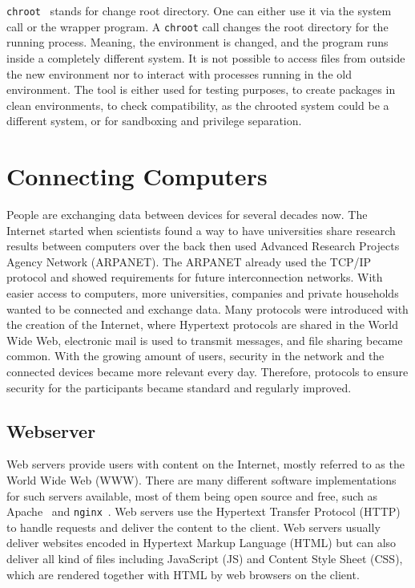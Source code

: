 \texttt{chroot}~\cite{ogroupchroot} stands for \textquotedbl change root
directory\textquotedbl. One can either use it via the system call or the
wrapper program. A \texttt{chroot} call changes the root directory for the
running process. Meaning, the environment is changed, and the program runs
inside a completely different system. It is not possible to access files from
outside the new environment nor to interact with processes running in the old
environment. The tool is either used for testing purposes, to create packages
in clean environments, to check compatibility, as the chrooted system could be
a different system, or for sandboxing and privilege separation.

\section{Connecting Computers}

People are exchanging data between devices for several decades now. The Internet
started when scientists found a way to have universities share research results
between computers over the back then used Advanced Research Projects Agency
Network (ARPANET).  The ARPANET already used the TCP/IP protocol and showed
requirements for future interconnection networks. With easier access to
computers, more universities, companies and private households wanted to be
connected and exchange data. Many protocols were introduced with the creation of
the Internet, where Hypertext protocols are shared in the World Wide Web,
electronic mail is used to transmit messages, and file sharing became common.
With the growing amount of users, security in the network and the connected
devices became more relevant every day. Therefore, protocols to ensure security
for the participants became standard and regularly improved.

\subsection{Webserver}

Web servers provide users with content on the Internet, mostly referred to as
the World Wide Web (WWW). There are many different software implementations for
such servers available, most of them being open source and free, such as
Apache~\cite{apacheweb} and \texttt{nginx}~\cite{nginxweb}. Web servers use the
Hypertext Transfer Protocol (HTTP) to handle requests and deliver the content to
the client. Web servers usually deliver websites encoded in Hypertext Markup
Language (HTML) but can also deliver all kind of files including JavaScript (JS)
and Content Style Sheet (CSS), which are rendered together with HTML by web
browsers on the client.

